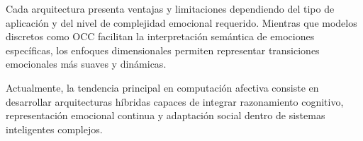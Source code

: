 Cada arquitectura presenta ventajas y limitaciones dependiendo del tipo de aplicación y del nivel de complejidad emocional requerido. Mientras que modelos discretos como OCC facilitan la interpretación semántica de emociones específicas, los enfoques dimensionales permiten representar transiciones emocionales más suaves y dinámicas.

Actualmente, la tendencia principal en computación afectiva consiste en desarrollar arquitecturas híbridas capaces de integrar razonamiento cognitivo, representación emocional continua y adaptación social dentro de sistemas inteligentes complejos.